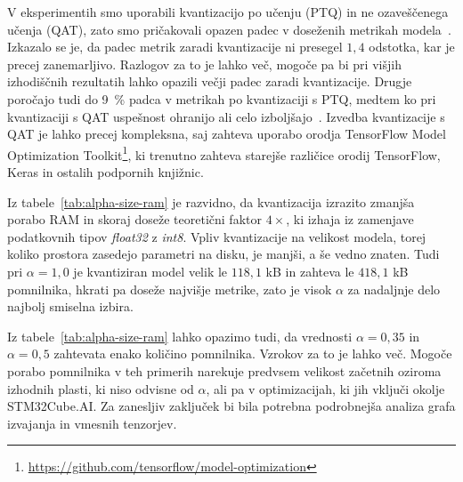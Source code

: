 \documentclass[a4paper,twoside,openright,12pt,slovene]{book}
\begin{document}
        V eksperimentih smo uporabili kvantizacijo po učenju (PTQ) in ne
        ozaveščenega učenja (QAT), zato smo pričakovali opazen padec v
        doseženih metrikah modela~\cite{src:Nikodinovska_2024}. Izkazalo se je,
        da padec metrik zaradi kvantizacije ni presegel $1{,}4$ odstotka, kar
        je precej zanemarljivo. Razlogov za to je lahko več, mogoče pa bi pri
        višjih izhodiščnih rezultatih lahko opazili večji padec zaradi
        kvantizacije. Drugje poročajo tudi do 9~\% padca v metrikah po
        kvantizaciji s PTQ, medtem ko pri kvantizaciji s QAT uspešnost ohranijo
        ali celo izboljšajo~\cite{src:Nikodinovska_2024}. Izvedba kvantizacije
        s QAT je lahko precej kompleksna, saj zahteva uporabo orodja TensorFlow
        Model Optimization
        Toolkit\footnote{\url{https://github.com/tensorflow/model-optimization}},
        ki trenutno zahteva starejše različice orodij TensorFlow, Keras in
        ostalih podpornih knjižnic.

        Iz tabele~\ref{tab:alpha-size-ram}
        je
        razvidno, da kvantizacija izrazito zmanjša porabo RAM in skoraj doseže
        teoretični faktor \(4\times\), ki izhaja iz zamenjave podatkovnih tipov
        \textit{float32} z \textit{int8}. Vpliv kvantizacije na velikost
        modela, torej koliko prostora zasedejo parametri na disku, je manjši, a
        še vedno znaten. Tudi pri $\alpha = 1{,}0$ je kvantiziran model velik
        le $118{,}1$ kB in zahteva le $418{,}1$ kB pomnilnika, hkrati pa doseže
        najvišje metrike, zato je visok $\alpha$ za nadaljnje delo najbolj
        smiselna izbira.

        Iz tabele~\ref{tab:alpha-size-ram}
        lahko opazimo tudi, da vrednosti \(\alpha=0{,}35\) in \(\alpha=0{,}5\)
        zahtevata enako količino pomnilnika. Vzrokov za to je lahko več. Mogoče
        porabo pomnilnika v teh primerih narekuje predvsem velikost začetnih
        oziroma izhodnih plasti, ki niso odvisne od \(\alpha\), ali pa v
        optimizacijah, ki jih vključi okolje STM32Cube.AI. Za zanesljiv zaključek
        bi bila potrebna podrobnejša analiza grafa izvajanja in vmesnih
        tenzorjev.
\end{document}
